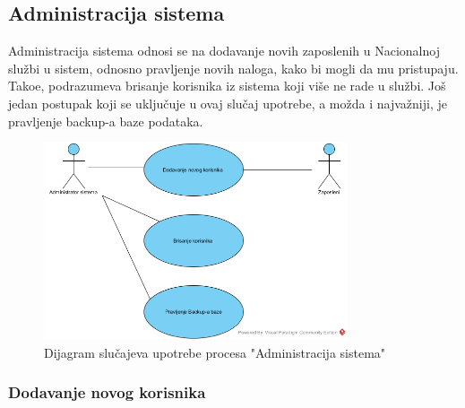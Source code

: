 \subsection{Administracija sistema}

Administracija sistema odnosi se na dodavanje novih zaposlenih u Nacionalnoj slu\v zbi u sistem, odnosno pravljenje novih naloga, kako bi mogli da mu pristupaju. Tako\dj e, podrazumeva brisanje korisnika iz sistema koji vi\v se ne rade u slu\v zbi. Jo\v s jedan postupak koji se uklju\v cuje u ovaj slu\v caj upotrebe, a mo\v zda i najva\v zniji, je pravljenje backup-a baze podataka.

\begin{figure}[H]
	\centering
	\includegraphics[width=0.8\textwidth]{dijagrami/dijagrami-slucajeva-upotrebe/administracija-sistema.png}
	\caption{Dijagram slu\v cajeva upotrebe procesa "Administracija sistema"}
	\label{dsu: administracija sistema}
\end{figure}

\subsubsection{Dodavanje novog korisnika}

